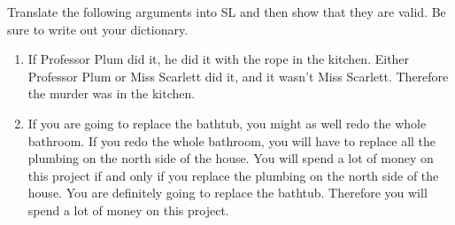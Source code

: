 \noindent\problempart Translate the following arguments into SL and then show that they are valid. Be sure to write out your dictionary. 
\begin{enumerate}[label=(\arabic*)]
\item If Professor Plum did it, he did it with the rope in the kitchen. Either Professor Plum or Miss Scarlett did it, and it wasn't Miss Scarlett. Therefore the murder was in the kitchen.  


\item If you are going to replace the bathtub, you might as well redo the whole bathroom. If you redo the whole bathroom, you will have to replace all the plumbing on the north side of the house. You will spend a lot of money on this project if and only if you replace the plumbing on the north side of the house. You are definitely going to replace the bathtub. Therefore you will spend a lot of money on this project. 


\end{enumerate}

